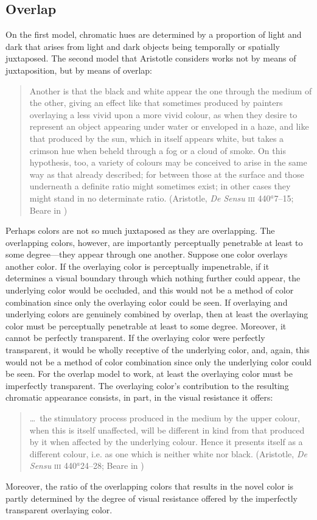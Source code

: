 \subsection{Overlap} %
\label{sub:overlap}
On the first model, chromatic hues are determined by a proportion of light and dark that arises from light and dark objects being temporally or spatially juxtaposed. The second model that Aristotle considers works not by means of juxtaposition, but by means of overlap:
\begin{quote}
	Another is that the black and white appear the one through the medium of the other, giving an effect like that sometimes produced by painters overlaying a less vivid upon a more vivid colour, as when they desire to represent an object appearing under water or enveloped in a haze, and like that produced by the sun, which in itself appears white, but takes a crimson hue when beheld through a fog or a cloud of smoke. On this hypothesis, too, a variety of colours may be conceived to arise in the same way as that already described; for between those at the surface and those underneath a definite ratio might sometimes exist; in other cases they might stand in no determinate ratio. (Aristotle, \emph{De Sensu} \textsc{iii} 440\( ^{a} \)7--15; Beare in \citealt[8--9]{Barnes:1984uq})
\end{quote}
Perhaps colors are not so much juxtaposed as they are overlapping. The overlapping colors, however, are importantly perceptually penetrable at least to some degree---they appear through one another. Suppose one color overlays another color. If the overlaying color is perceptually impenetrable, if it determines a visual boundary through which nothing further could appear, the underlying color would be occluded, and this would not be a method of color combination since only the overlaying color could be seen. If overlaying and underlying colors are genuinely combined by overlap, then at least the overlaying color must be perceptually penetrable at least to some degree. Moreover, it cannot be perfectly transparent. If the overlaying color were perfectly transparent, it would be wholly receptive of the underlying color, and, again, this would not be a method of color combination since only the underlying color could be seen. For the overlap model to work, at least the overlaying color must be imperfectly transparent. The overlaying color's contribution to the resulting chromatic appearance consists, in part, in the visual resistance it offers:
\begin{quote}
	\ldots\ the stimulatory process produced in the medium by the upper colour, when this is itself unaffected, will be different in kind from that produced by it when affected by the underlying colour. Hence it presents itself as a different colour, i.e. as one which is neither white nor black. (Aristotle, \emph{De Sensu} \textsc{iii} 440\( ^{a} \)24--28; Beare in \citealt[9]{Barnes:1984uq})
\end{quote}
Moreover, the ratio of the overlapping colors that results in the novel color is partly determined by the degree of visual resistance offered by the imperfectly transparent overlaying color.

